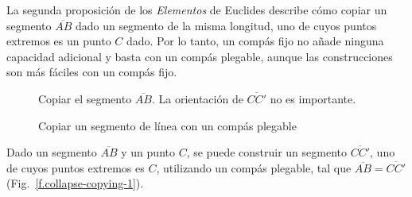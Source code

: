 La segunda proposición de los \textit{Elementos} de Euclides describe cómo copiar un segmento $\overline{AB}$ dado un segmento de la misma longitud, uno de cuyos puntos extremos es un punto $C$ dado. Por lo tanto, un compás fijo no añade ninguna capacidad adicional y basta con un compás plegable, aunque las construcciones son más fáciles con un compás fijo.

\begin{figure}[t]
\begin{minipage}{.45\textwidth}
\begin{center}
\caption{Copiar el segmento $\overline{AB}$. La orientación de $\overline{CC'}$ no es importante.}\label{f.collapse-copying-1}
\end{center}
\end{minipage}
\hfill
\begin{minipage}{.45\textwidth}
\begin{center}
\caption{Copiar un segmento de línea con un compás plegable}\label{f.collapse-copying-2}
\end{center}
\end{minipage}
\end{figure}

\begin{theorem}
Dado un segmento $\overline{AB}$ y un punto $C$, se puede construir un segmento $\overline{CC'}$, uno de cuyos puntos extremos es $C$, utilizando un compás plegable, tal que $\overline{AB}=\overline{CC'}$ (Fig.~\ref{f.collapse-copying-1}).
\end{theorem}



